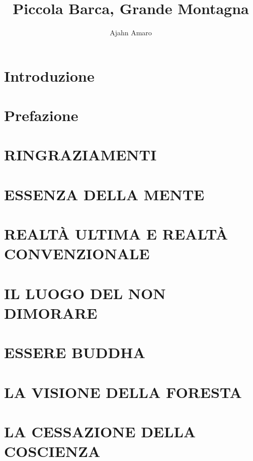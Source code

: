 \documentclass[11pt]{memoir}
\title{Piccola Barca, Grande Montagna}
\author{Ajahn Amaro}
\begin{document}


\tableofcontents

\chapter*{Introduzione}


\chapter*{Prefazione}


\chapter*{RINGRAZIAMENTI}


\chapter*{ESSENZA DELLA MENTE}
\thispagestyle{empty}

\chapter{REALT\`A ULTIMA E REALT\`A CONVENZIONALE}


\chapter{IL LUOGO DEL NON DIMORARE}


\chapter*{ESSERE BUDDHA}
\thispagestyle{empty}

\chapter{LA VISIONE DELLA FORESTA}


\chapter{LA CESSAZIONE DELLA COSCIENZA}

\end{document}
